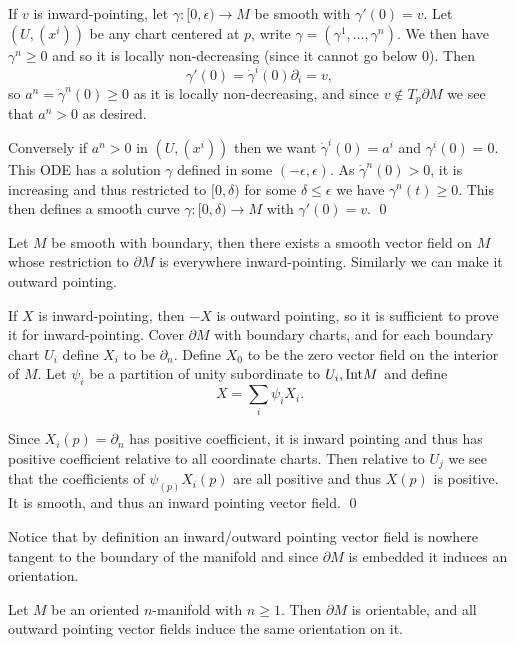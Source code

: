     If $v$ is inward-pointing, let $\gamma\colon[0,\epsilon)\to M$ be smooth with $\gamma'(0)=v$.
    Let $(U,(x^i))$ be any chart centered at $p$, write $\gamma=(\gamma^1,\dots,\gamma^n)$.
    We then have $\gamma^n\geq0$ and so it is locally non-decreasing (since it cannot go below $0$).
    Then
    $$ \gamma'(0) = \dot\gamma^i(0)\partial_i = v , $$
    so $a^n=\dot\gamma^n(0)\geq0$ as it is locally non-decreasing, and since $v\notin T_p\partial M$ we see that
    $a^n>0$ as desired.

    Conversely if $a^n>0$ in $(U,(x^i))$ then we want $\dot\gamma^i(0)=a^i$ and $\gamma^i(0)=0$.
    This ODE has a solution $\gamma$ defined in some $(-\epsilon,\epsilon)$.
    As $\dot\gamma^n(0)>0$, it is increasing and thus restricted to $[0,\delta)$ for some $\delta\leq\epsilon$
    we have $\gamma^n(t)\geq0$.
    This then defines a smooth curve $\gamma\colon[0,\delta)\to M$ with $\gamma'(0)=v$.
    \qed

\eproof

\blemm

    Let $M$ be smooth with boundary, then there exists a smooth vector field on $M$ whose restriction to $\partial M$
    is everywhere inward-pointing.
    Similarly we can make it outward pointing.

\elemm

\bproof

    If $X$ is inward-pointing, then $-X$ is outward pointing, so it is sufficient to prove it for inward-pointing.
    Cover $\partial M$ with boundary charts, and for each boundary chart $U_i$ define $X_i$ to be $\partial_n$.
    Define $X_0$ to be the zero vector field on the interior of $M$.
    Let $\psi_i$ be a partition of unity subordinate to $U_i,{\rm Int} M$ and define
    $$ X = \sum_i\psi_iX_i . $$

    Since $X_i(p)=\partial_n$ has positive coefficient, it is inward pointing and thus has positive coefficient relative
    to all coordinate charts.
    Then relative to $U_j$ we see that the coefficients of $\psi_(p)X_i(p)$ are all positive and thus $X(p)$ is positive.
    It is smooth, and thus an inward pointing vector field.
    \qed

\eproof

Notice that by definition an inward/outward pointing vector field is nowhere tangent to the boundary of the manifold
and since $\partial M$ is embedded it induces an orientation.

\bprop

    Let $M$ be an oriented $n$-manifold with $n\geq1$.
    Then $\partial M$ is orientable, and all outward pointing vector fields induce the same orientation on it.


